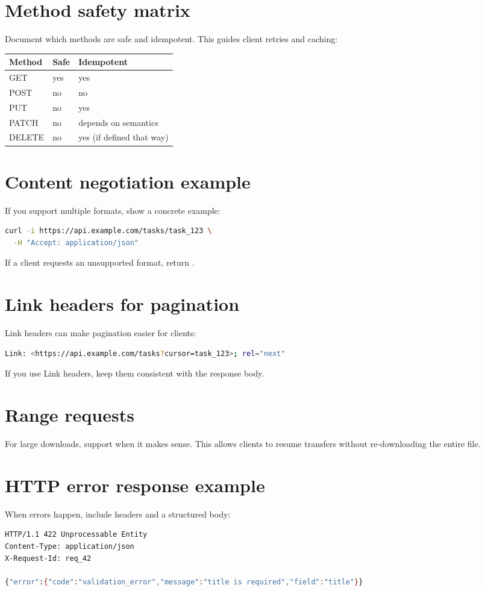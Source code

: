 \section{Method safety matrix}
Document which methods are safe and idempotent.
This guides client retries and caching:
\begin{tabularx}{\textwidth}{@{}lXX@{}}
\toprule
Method & Safe & Idempotent \\
\midrule
GET & yes & yes \\
POST & no & no \\
PUT & no & yes \\
PATCH & no & depends on semantics \\
DELETE & no & yes (if defined that way) \\
\bottomrule
\end{tabularx}

\section{Content negotiation example}
If you support multiple formats, show a concrete example:
\begin{lstlisting}[language=Bash]
curl -i https://api.example.com/tasks/task_123 \
  -H "Accept: application/json"
\end{lstlisting}

If a client requests an unsupported format, return .

\section{Link headers for pagination}
Link headers can make pagination easier for clients:
\begin{lstlisting}[language=Bash]
Link: <https://api.example.com/tasks?cursor=task_123>; rel="next"
\end{lstlisting}

If you use Link headers, keep them consistent with the response body.

\section{Range requests}
For large downloads, support  when it makes sense.
This allows clients to resume transfers without re-downloading the entire file.

\section{HTTP error response example}
When errors happen, include headers and a structured body:
\begin{lstlisting}[language=Bash]
HTTP/1.1 422 Unprocessable Entity
Content-Type: application/json
X-Request-Id: req_42

{"error":{"code":"validation_error","message":"title is required","field":"title"}}
\end{lstlisting}

